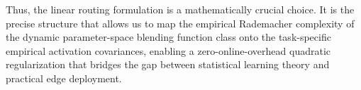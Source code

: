 Thus, the linear routing formulation is a mathematically crucial choice. It is the precise structure that allows us to map the empirical Rademacher complexity of the dynamic parameter-space blending function class onto the task-specific empirical activation covariances, enabling a zero-online-overhead quadratic regularization that bridges the gap between statistical learning theory and practical edge deployment.
